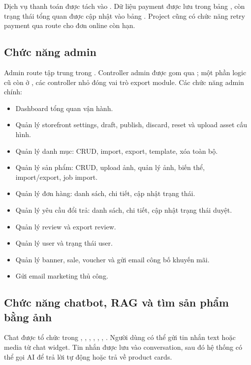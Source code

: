\documentclass[12pt,a4paper]{report}
\begin{document}
Dịch vụ thanh toán được tách vào . Dữ liệu payment được lưu trong bảng , còn trạng thái tổng quan được cập nhật vào bảng . Project cũng có chức năng retry payment qua route  cho đơn online còn hạn.

\subsection{Chức năng admin}

Admin route tập trung trong . Controller admin được gom qua ; một phần logic cũ còn ở , các controller nhỏ đóng vai trò export module. Các chức năng admin chính:

\begin{itemize}
    \item Dashboard tổng quan vận hành.
    \item Quản lý storefront settings, draft, publish, discard, reset và upload asset cấu hình.
    \item Quản lý danh mục: CRUD, import, export, template, xóa toàn bộ.
    \item Quản lý sản phẩm: CRUD, upload ảnh, quản lý ảnh, biến thể, import/export, job import.
    \item Quản lý đơn hàng: danh sách, chi tiết, cập nhật trạng thái.
    \item Quản lý yêu cầu đổi trả: danh sách, chi tiết, cập nhật trạng thái duyệt.
    \item Quản lý review và export review.
    \item Quản lý user và trạng thái user.
    \item Quản lý banner, sale, voucher và gửi email công bố khuyến mãi.
    \item Gửi email marketing thủ công.
\end{itemize}

\subsection{Chức năng chatbot, RAG và tìm sản phẩm bằng ảnh}

Chat được tổ chức trong , , , , , , . Người dùng có thể gửi tin nhắn text hoặc media từ chat widget. Tin nhắn được lưu vào conversation, sau đó hệ thống có thể gọi AI để trả lời tự động hoặc trả về product cards.
\end{document}
